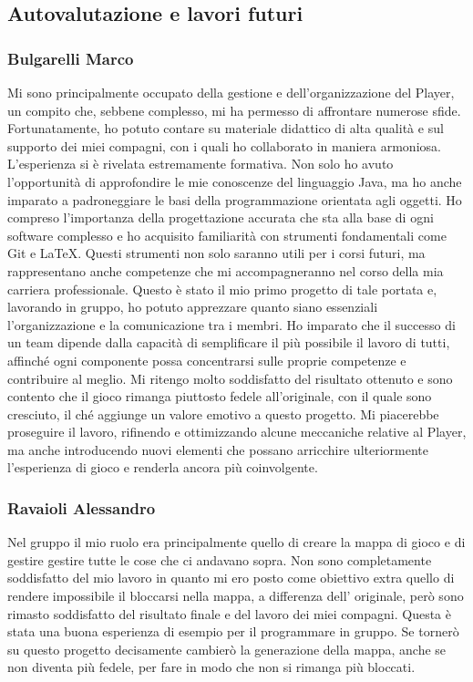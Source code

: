 \documentclass{report}
\begin{document}
\subsection{Autovalutazione e lavori futuri}

\subsubsection{Bulgarelli Marco}
Mi sono principalmente occupato della gestione e dell’organizzazione del Player, un compito che, sebbene complesso, mi ha permesso di affrontare numerose sfide. Fortunatamente, ho potuto contare su materiale didattico di alta qualità e sul supporto dei miei compagni, con i quali ho collaborato in maniera armoniosa. \newline
L’esperienza si è rivelata estremamente formativa. Non solo ho avuto l’opportunità di approfondire le mie conoscenze del linguaggio Java, ma ho anche imparato a padroneggiare le basi della programmazione orientata agli oggetti. Ho compreso l’importanza della progettazione accurata che sta alla base di ogni software complesso 
e ho acquisito familiarità con strumenti fondamentali come Git e LaTeX. Questi strumenti non solo saranno utili per i corsi futuri, ma rappresentano anche competenze che mi accompagneranno nel corso della mia carriera professionale. \newline
Questo è stato il mio primo progetto di tale portata e, lavorando in gruppo, ho potuto apprezzare quanto siano essenziali l’organizzazione e la comunicazione tra i membri. Ho imparato che il successo di un team dipende dalla capacità di semplificare il più possibile il lavoro di tutti, affinché ogni componente possa concentrarsi 
sulle proprie competenze e contribuire al meglio. \newline
Mi ritengo molto soddisfatto del risultato ottenuto e sono contento che il gioco rimanga piuttosto fedele all’originale, con il quale sono cresciuto, il ché aggiunge un valore emotivo a questo progetto. Mi piacerebbe proseguire il lavoro, rifinendo e ottimizzando alcune meccaniche relative al Player, ma anche introducendo nuovi 
elementi che possano arricchire ulteriormente l’esperienza di gioco e renderla ancora più coinvolgente.

\subsubsection{Ravaioli Alessandro}
Nel gruppo il mio ruolo era principalmente quello di creare la mappa di gioco e di gestire gestire tutte le cose che ci andavano sopra.
%
Non sono completamente soddisfatto del mio lavoro in quanto mi ero posto come obiettivo extra quello di rendere impossibile il bloccarsi nella mappa, a differenza dell' originale,
%
però sono rimasto soddisfatto del risultato finale e del lavoro dei miei compagni. Questa è stata una buona esperienza di esempio per il programmare in gruppo. 
%
Se tornerò su questo progetto decisamente cambierò la generazione della mappa, anche se non diventa più fedele, per fare in modo che non si rimanga più bloccati.
\end{document}
